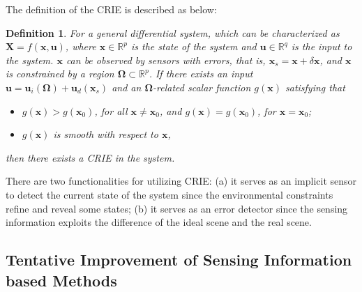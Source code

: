 \documentclass[journal,twoside,web]{ieeecolor}
\newtheorem{definition}{\bf Definition}
\begin{document}
The definition of the CRIE is described as below:
\begin{definition}
    For a general differential system, which can be characterized as $ \mathbf{X}=f(\mathbf{x}, \mathbf{u}) $, where $ \mathbf{x} \in \mathbb{R}^{p} $ is the state of the system and $ \mathbf{u} \in \mathbb{R}^{q} $ is the input to the system. $ \mathbf{x} $ can be observed by sensors with errors, that is, $ \mathbf{x}_{s}=\mathbf{x}+\delta\mathbf{x} $, and $ \mathbf{x} $ is constrained by a region $ \mathbf{\Omega} \subset \mathbb{R}^{p}$. If there exists an input $ \mathbf{u}=\mathbf{u}_{i}(\mathbf{\Omega})+\mathbf{u}_{d}(\mathbf{x}_{s}) $ and an $ \mathbf{\Omega} $-related scalar function $ g(\mathbf{x}) $ satisfying that
    \begin{itemize}
        \item $ g(\mathbf{x}) > g(\mathbf{x}_{0}) $, for all $ \mathbf{x} \ne \mathbf{x}_{0} $, and $ g(\mathbf{x}) = g(\mathbf{x}_{0}) $, for $ \mathbf{x} = \mathbf{x}_{0} $;
        \item $ g(\mathbf{x}) $ is smooth with respect to $ \mathbf{x} $,
    \end{itemize}
    then there exists a CRIE in the system.
\end{definition}

There are two functionalities for utilizing CRIE: 
(a) it serves as an implicit sensor to detect the current state of the system since the environmental constraints refine and reveal some states;
(b) it serves as an error detector since the sensing information exploits the difference of the ideal scene and the real scene.

\subsection{Tentative Improvement of Sensing Information based Methods}
\label{subsec:tentative}
\end{document}

